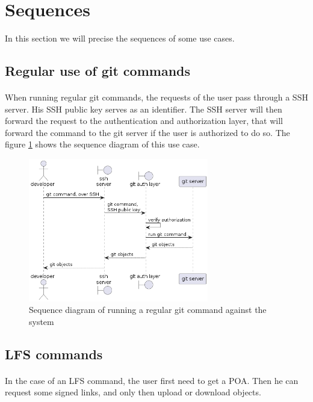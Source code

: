 \newpage
\section{Sequences}

In this section we will precise the sequences of some use cases.

\subsection{Regular use of git commands}

\paragraph{}
When running regular git commands, the requests of the user pass through a SSH server. His SSH public key serves as an identifier. The SSH server will then forward the request to the authentication and authorization layer, that will forward the command to the git server if the user is authorized to do so. The figure \ref{fig:sequence_git} shows the sequence diagram of this use case.

\begin{figure}[h]
    \centering
    \includegraphics[width=0.7\textwidth]{iteration_02/diagrams/sequence_git.png}
    \caption{Sequence diagram of running a regular git command against the system}
    \label{fig:sequence_git}
\end{figure}

\subsection{LFS commands}

\paragraph{}
In the case of an LFS command, the user first need to get a POA. Then he can request some signed links, and only then upload or download objects. 

